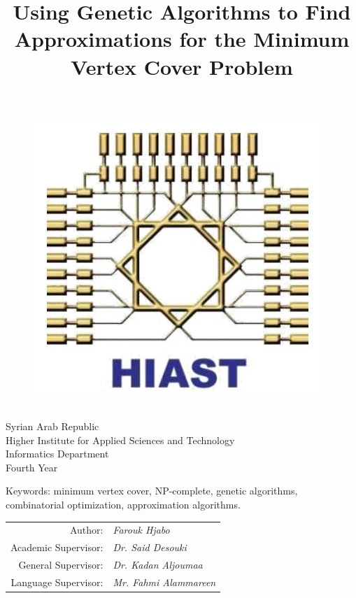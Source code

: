 \documentclass[12pt]{article}
\title{Using Genetic Algorithms to Find Approximations for the Minimum Vertex Cover Problem}
\author{}
\date{}
\newcommand{\lineSeparationLength}{2mm}
\begin{document}

{
\begin{figure}
\hfill
\includegraphics[width=0.9\linewidth]{hiast}
\end{figure}

\ \\[\lineSeparationLength]
Syrian Arab Republic \\[\lineSeparationLength]
Higher Institute for Applied Sciences and Technology \\[\lineSeparationLength]
Informatics Department \\[\lineSeparationLength]
Fourth Year
}

\vspace{25mm}
{\let\newpage\relax\maketitle}

\vspace{-10mm}
\begin{center}
Keywords: minimum vertex cover, NP-complete, genetic algorithms,\\
combinatorial optimization, approximation algorithms.
\end{center}

\vspace{5mm}
\begin{center}
\begin{onehalfspacing}

\begin{tabular}{r l}
Author:					&	\textit{Farouk Hjabo} \\
Academic Supervisor:	&	\textit{Dr. Said Desouki} \\
General Supervisor:		&	\textit{Dr. Kadan Aljoumaa} \\
Language Supervisor:	&	\textit{Mr. Fahmi Alammareen} \\
\end{tabular}

\end{onehalfspacing}
\end{center}
\end{document}
